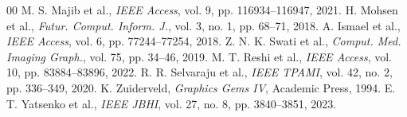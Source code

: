 \documentclass[conference]{IEEEtran}
\begin{document}
\begin{thebibliography}{00}
 M. S. Majib et al., \textit{IEEE Access}, vol. 9, pp. 116934--116947, 2021.
 H. Mohsen et al., \textit{Futur. Comput. Inform. J.}, vol. 3, no. 1, pp. 68--71, 2018.
 A. Ismael et al., \textit{IEEE Access}, vol. 6, pp. 77244--77254, 2018.
 Z. N. K. Swati et al., \textit{Comput. Med. Imaging Graph.}, vol. 75, pp. 34--46, 2019.
 M. T. Reshi et al., \textit{IEEE Access}, vol. 10, pp. 83884--83896, 2022.
 R. R. Selvaraju et al., \textit{IEEE TPAMI}, vol. 42, no. 2, pp. 336--349, 2020.
 K. Zuiderveld, \textit{Graphics Gems IV}, Academic Press, 1994.
 E. T. Yatsenko et al., \textit{IEEE JBHI}, vol. 27, no. 8, pp. 3840--3851, 2023.
\end{thebibliography}
\end{document}
